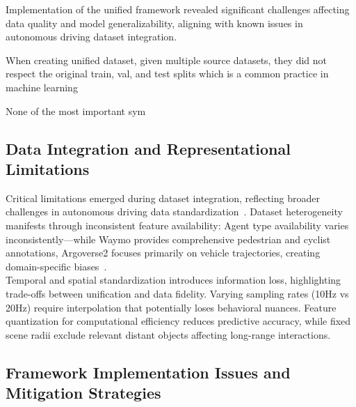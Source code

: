 Implementation of the unified framework revealed significant challenges affecting data quality and model generalizability, aligning with known issues in autonomous driving dataset integration.

When creating unified dataset, given multiple source datasets, they did not respect the original train, val, and test splits which is a common practice in machine learning

None of the most important sym

\subsection{Data Integration and Representational Limitations}
\label{ssec:data_limitations}

Critical limitations emerged during dataset integration, reflecting broader challenges in autonomous driving data standardization~\cite{hu2023planning}. Dataset heterogeneity manifests through inconsistent feature availability: Agent type availability varies inconsistently—while Waymo provides comprehensive pedestrian and cyclist annotations, Argoverse2 focuses primarily on vehicle trajectories, creating domain-specific biases~\cite{unitrajFeng2024}.\\
Temporal and spatial standardization introduces information loss, highlighting trade-offs between unification and data fidelity. Varying sampling rates (10Hz vs 20Hz) require interpolation that potentially loses behavioral nuances. Feature quantization for computational efficiency reduces predictive accuracy, while fixed scene radii exclude relevant distant objects affecting long-range interactions.

\subsection{Framework Implementation Issues and Mitigation Strategies}
\label{ssec:framework_issues}

